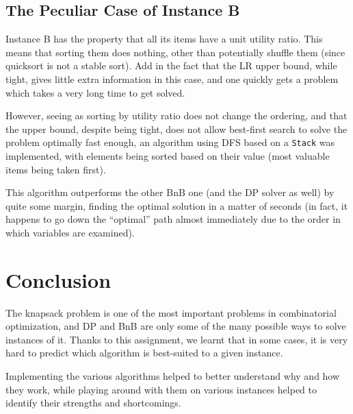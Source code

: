 \documentclass[journal]{IEEEtran}
\newcommand{\scala}[1]{\texttt{#1}}
\begin{document}
\subsection{The Peculiar Case of Instance B}
Instance B has the property that all its items have a unit utility ratio.
This means that sorting them does nothing, other than potentially shuffle them (since quicksort is not a stable sort).
Add in the fact that the LR upper bound, while tight, gives little extra information in this case, and one quickly gets a problem which takes a very long time to get solved.

However, seeing as sorting by utility ratio does not change the ordering, and that the upper bound, despite being tight, does not allow best-first search to solve the problem optimally fast enough, an algorithm using DFS based on a \scala{Stack} was implemented, with elements being sorted based on their value (most valuable items being taken first).

This algorithm outperforms the other BnB one (and the DP solver as well) by quite some margin, finding the optimal solution in a matter of seconds (in fact, it happens to go down the ``optimal'' path almost immediately due to the order in which variables are examined).

\section{Conclusion}
The knapsack problem is one of the most important problems in combinatorial optimization, and DP and BnB are only some of the many possible ways to solve instances of it.
Thanks to this assignment, we learnt that in some cases, it is very hard to predict which algorithm is best-suited to a given instance.

Implementing the various algorithms helped to better understand why and how they work, while playing around with them on various instances helped to identify their strengths and shortcomings.
\end{document}
